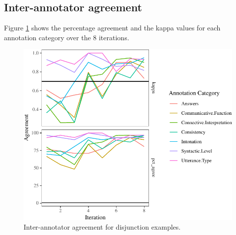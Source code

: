 \documentclass[,man,floatsintext]{apa6}
\begin{document}
\hypertarget{inter-annotator-agreement}{%
\subsection{Inter-annotator agreement}\label{inter-annotator-agreement}}

Figure \ref{fig:oReliabilityPlot} shows the percentage agreement and the kappa values for each annotation category over the 8 iterations.

\begin{figure}[tb]

{\centering \includegraphics{figs/oReliabilityPlot-1} 

}

\caption{Inter-annotator agreement for disjunction examples.}\label{fig:oReliabilityPlot}
\end{figure}
\end{document}
